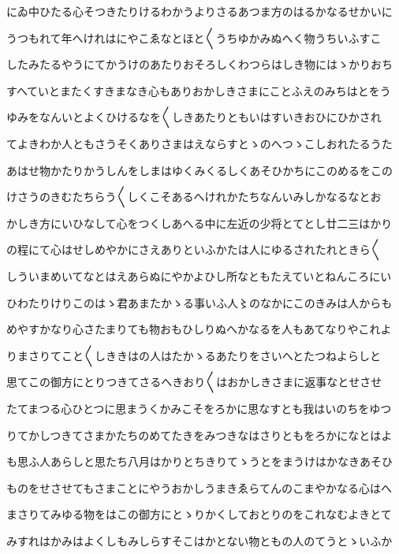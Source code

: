 \documentclass[a4paper,11pt,landscape]{ltjtarticle}
\begin{document}
\par\medskip
にゐ中ひたる心そつきたりけるわかうよりさるあつま方のはるかなるせかいに
\par\medskip
うつもれて年へけれはにやこゑなとほと〱うちゆかみぬへく物うちいふすこ
\par\medskip
したみたるやうにてかうけのあたりおそろしくわつらはしき物にはゝかりおち
\par\medskip
すへていとまたくすきまなき心もありおかしきさまにことふえのみちはとをう
\par\medskip
ゆみをなんいとよくひけるなを〱しきあたりともいはすいきおひにひかされ
\par\medskip
てよきわか人ともさうそくありさまはえならすとゝのへつゝこしおれたるうた
\par\medskip
あはせ物かたりかうしんをしまはゆくみくるしくあそひかちにこのめるをこの
\par\medskip
けさうのきむたちらう〱しくこそあるへけれかたちなんいみしかなるなとお
\par\medskip
かしき方にいひなして心をつくしあへる中に左近の少将とてとし廿二三はかり
\par\medskip
の程にて心はせしめやかにさえありといふかたは人にゆるされたれときら〱
\par\medskip
しういまめいてなとはえあらぬにやかよひし所なともたえていとねんころにい
\par\medskip
ひわたりけりこのはゝ君あまたかゝる事いふ人〻のなかにこのきみは人からも
\par\medskip
めやすかなり心さたまりても物おもひしりぬへかなるを人もあてなりやこれよ
\par\medskip
りまさりてこと〱しききはの人はたかゝるあたりをさいへとたつねよらしと
\par\medskip
思てこの御方にとりつきてさるへきおり〱はおかしきさまに返事なとせさせ
\par\medskip
たてまつる心ひとつに思まうくかみこそをろかに思なすとも我はいのちをゆつ
\par\medskip
りてかしつきてさまかたちのめてたきをみつきなはさりともをろかになとはよ
\par\medskip
も思ふ人あらしと思たち八月はかりとちきりてゝうとをまうけはかなきあそひ
\par\medskip
ものをせさせてもさまことにやうおかしうまきゑらてんのこまやかなる心はへ
\par\medskip
まさりてみゆる物をはこの御方にとゝりかくしておとりのをこれなむよきとて
\par\medskip
みすれはかみはよくしもみしらすそこはかとない物ともの人のてうとゝいふか
\par\medskip
\end{document}
